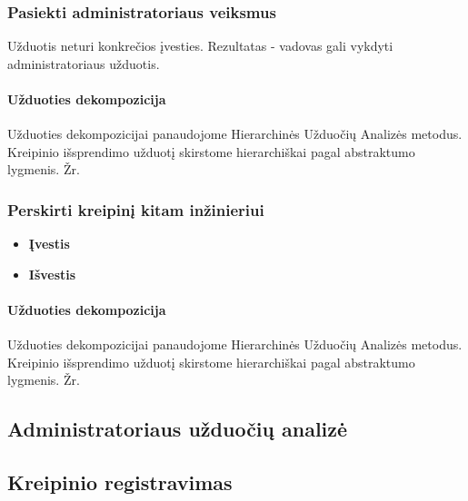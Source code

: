 	\subsubsection{Pasiekti administratoriaus veiksmus}

	Užduotis neturi konkrečios įvesties. 
	Rezultatas - vadovas gali vykdyti administratoriaus užduotis.
		
	\paragraph{Užduoties dekompozicija}
	
	Užduoties dekompozicijai panaudojome Hierarchinės Užduočių Analizės metodus.
	Kreipinio išsprendimo užduotį skirstome hierarchiškai pagal abstraktumo lygmenis. 
	Žr. 	
 		

	\subsubsection{Perskirti kreipinį kitam inžinieriui}

		\begin{itemize}
			\item \textbf{Įvestis}
			\item \textbf{Išvestis} 
		\end{itemize}
		
	\paragraph{Užduoties dekompozicija}
	
	Užduoties dekompozicijai panaudojome Hierarchinės Užduočių Analizės metodus.
	Kreipinio išsprendimo užduotį skirstome hierarchiškai pagal abstraktumo lygmenis. 
	Žr. 
 	

\subsection {Administratoriaus užduočių analizė}

	\subsection {Kreipinio registravimas}

